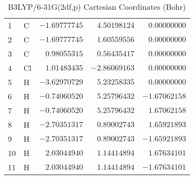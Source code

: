 \documentclass[10pt,oneside]{article}
\begin{document}
\begin{table}[h]
\centering
\caption{B3LYP/6-31G(2df,p) Cartesian Coordinates (Bohr)}
\begin{tabular}{llrrr}
\toprule
1  & C  & $-1.69777745$ & $ 4.50198124$ & $ 0.00000000$ \\
2  & C  & $-1.69777745$ & $ 1.60559556$ & $ 0.00000000$ \\
3  & C  & $ 0.98055315$ & $ 0.56435417$ & $ 0.00000000$ \\
4  & Cl & $ 1.01483435$ & $-2.86069163$ & $ 0.00000000$ \\
5  & H  & $-3.62970729$ & $ 5.23258335$ & $ 0.00000000$ \\
6  & H  & $-0.74060520$ & $ 5.25796432$ & $-1.67062158$ \\
7  & H  & $-0.74060520$ & $ 5.25796432$ & $ 1.67062158$ \\
8  & H  & $-2.70351317$ & $ 0.89002743$ & $ 1.65921893$ \\
9  & H  & $-2.70351317$ & $ 0.89002743$ & $-1.65921893$ \\
10 & H  & $ 2.03044940$ & $ 1.14414894$ & $ 1.67634101$ \\
11 & H  & $ 2.03044940$ & $ 1.14414894$ & $-1.67634101$ \\
\bottomrule
\end{tabular}
\end{table}
\end{document}
